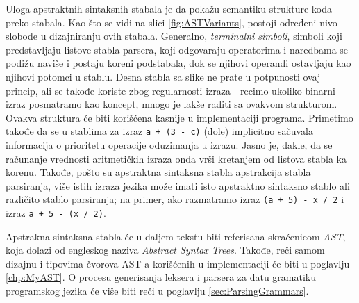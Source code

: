 Uloga apstraktnih sintaksnih stabala \cite{FormalSyntaxAndSemantics} je da pokažu semantiku strukture koda preko stabala. Kao što se vidi na slici \ref{fig:ASTVariants}, postoji određeni nivo slobode u dizajniranju ovih stabala. Generalno, \emph{terminalni simboli}, simboli koji predstavljaju listove stabla parsera, koji odgovaraju operatorima i naredbama se podižu naviše i postaju koreni podstabala, dok se njihovi operandi ostavljaju kao njihovi potomci u stablu. Desna stabla sa slike ne prate u potpunosti ovaj princip, ali se takođe koriste zbog regularnosti izraza - recimo ukoliko binarni izraz posmatramo kao koncept, mnogo je lakše raditi sa ovakvom strukturom. Ovakva struktura će biti korišćena kasnije u implementaciji programa. Primetimo takođe da se u stablima za izraz \texttt{a + (3 - c)} (dole) implicitno sačuvala informacija o prioritetu operacije oduzimanja u izrazu. Jasno je, dakle, da se računanje vrednosti aritmetičkih izraza onda vrši kretanjem od listova stabla ka korenu. Takođe, pošto su apstraktna sintaksna stabla apstrakcija stabla parsiranja, više istih izraza jezika može imati isto apstraktno sintaksno stablo ali različito stablo parsiranja; na primer, ako razmatramo izraz \texttt{(a + 5) - x / 2} i izraz \texttt{a + 5 - (x / 2)}.

Apstrakna sintaksna stabla će u daljem tekstu biti referisana skraćenicom \emph{AST}, koja dolazi od engleskog naziva \emph{Abstract Syntax Trees}. Takođe, reči samom dizajnu i tipovima čvorova AST-a korišćenih u implementaciji će biti u poglavlju \ref{chp:MyAST}. O procesu generisanja leksera i parsera za datu gramatiku programskog jezika će više biti reči u poglavlju \ref{sec:ParsingGrammars}.